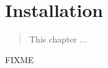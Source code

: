 \chapter{Installation}
\label{cha:installation}

\begin{quote}
   This chapter ...
\end{quote}

FIXME
